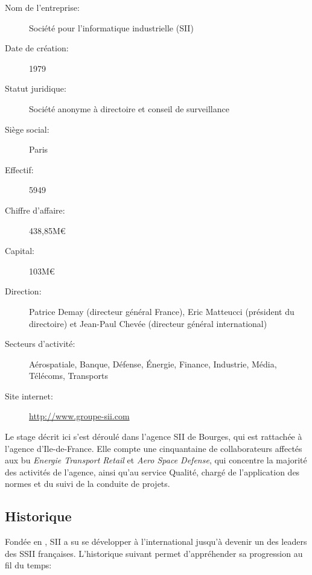 {{{{				\begin{description}
					\item[Nom de l'entreprise:] Société pour l'informatique industrielle (SII)
					\item[Date de création:] 1979\cite{sii_rf}
					\item[Statut juridique:] Société anonyme à directoire et conseil de surveillance
					\item[Siège social:] Paris
					\item[Effectif:] 5949\cite{sii_rs_2017}
					\item[Chiffre d'affaire:] 438,85M\euro\cite{sii_rs_2017}
					\item[Capital:] 103M\euro\cite{sii_rf}
					\item[Direction:] Patrice Demay (directeur général France), Eric Matteucci (président du directoire) et Jean-Paul Chevée (directeur général international)
					\item[Secteurs d'activité:] Aérospatiale, Banque, Défense, Énergie, Finance, Industrie, Média, Télécoms, Transports
					\item[Site internet:] \url{http://www.groupe-sii.com}
				\end{description}
			}
			
			\par
			{
				Le stage décrit ici s'est déroulé dans l'agence SII de Bourges, qui est rattachée à l'agence d'Ile-de-France. Elle compte une cinquantaine de collaborateurs affectés aux \gls{bu} \emph{Energie Transport Retail} et \emph{Aero Space Defense}, qui concentre la majorité des activités de l'agence, ainsi qu'au service Qualité, chargé de l'application des normes et du suivi de la conduite de projets.
			}
			
		}
		\subsection{Historique}
			
			\par
			{
				Fondée en , SII a su se développer à l'international jusqu'à devenir un des leaders des SSII françaises. L'historique suivant permet d'appréhender sa progression au fil du temps:
			}
			
}}
